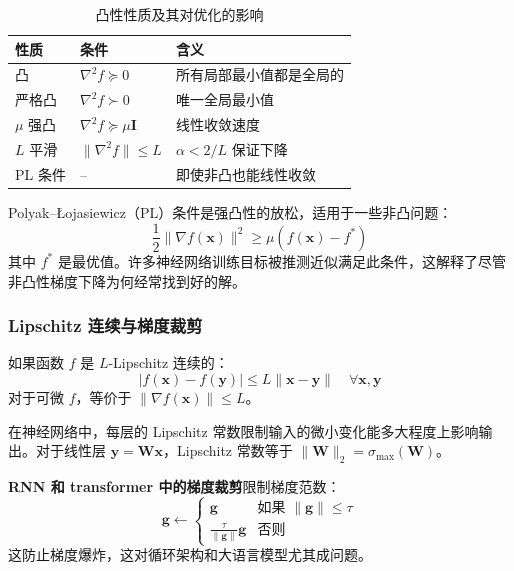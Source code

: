 \begin{table}[ht]
    \centering
    \caption{凸性性质及其对优化的影响}
    \begin{tabular}{L{3.5cm} L{4cm} L{5cm}}
        \toprule
        \textbf{性质} & \textbf{条件} & \textbf{含义} \\
        \midrule
        凸 & $\nabla^2 f \succeq 0$ & 所有局部最小值都是全局的 \\
        严格凸 & $\nabla^2 f \succ 0$ & 唯一全局最小值 \\
        $\mu$ 强凸 & $\nabla^2 f \succeq \mu\mathbf{I}$ & 线性收敛速度 \\
        $L$ 平滑 & $\|\nabla^2 f\| \leq L$ & $\alpha < 2/L$ 保证下降 \\
        PL 条件 & -- & 即使非凸也能线性收敛 \\
        \bottomrule
    \end{tabular}
\end{table}

Polyak--\L{}ojasiewicz（PL）条件是强凸性的放松，适用于一些非凸问题：
\begin{equation}
\frac{1}{2}\|\nabla f(\mathbf{x})\|^2 \geq \mu(f(\mathbf{x}) - f^*)
\end{equation}
其中 $f^*$ 是最优值。许多神经网络训练目标被推测近似满足此条件，这解释了尽管非凸性梯度下降为何经常找到好的解。

\subsubsection{Lipschitz 连续与梯度裁剪}

\begin{定义}[$L$-Lipschitz 连续]
如果函数 $f$ 是 $L$-Lipschitz 连续的：
\begin{equation}
|f(\mathbf{x}) - f(\mathbf{y})| \leq L\|\mathbf{x} - \mathbf{y}\| \quad \forall \mathbf{x}, \mathbf{y}
\end{equation}
对于可微 $f$，等价于 $\|\nabla f(\mathbf{x})\| \leq L$。
\end{定义}

在神经网络中，每层的 Lipschitz 常数限制输入的微小变化能多大程度上影响输出。对于线性层 $\mathbf{y} = \mathbf{W}\mathbf{x}$，Lipschitz 常数等于 $\|\mathbf{W}\|_2 = \sigma_{\max}(\mathbf{W})$。

\textbf{RNN 和 transformer 中的梯度裁剪}限制梯度范数：
\begin{equation}
\mathbf{g} \leftarrow \begin{cases}
\mathbf{g} & \text{如果 } \|\mathbf{g}\| \leq \tau \\
\frac{\tau}{\|\mathbf{g}\|} \mathbf{g} & \text{否则}
\end{cases}
\end{equation}
这防止梯度爆炸，这对循环架构和大语言模型尤其成问题。

